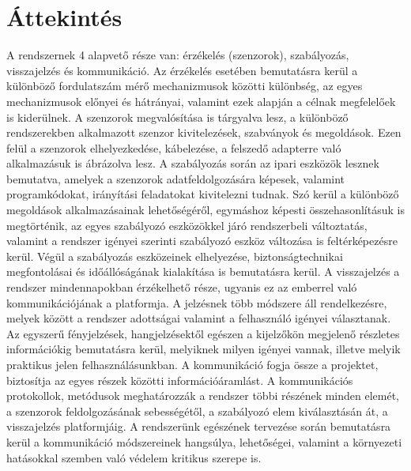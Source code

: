 \section{Áttekintés}

A rendszernek 4 alapvető része van: érzékelés (szenzorok), szabályozás, visszajelzés és kommunikáció.
Az érzékelés esetében bemutatásra kerül a különböző fordulatszám mérő mechanizmusok közötti különbség, az egyes mechanizmusok előnyei és hátrányai, valamint ezek alapján a célnak megfelelőek is kiderülnek. A szenzorok megvalósítása is tárgyalva lesz, a különböző rendszerekben alkalmazott szenzor kivitelezések, szabványok és megoldások. Ezen felül a szenzorok elhelyezkedése, kábelezése, a felszedő adapterre való alkalmazásuk is ábrázolva lesz.
A szabályozás során az ipari eszközök lesznek bemutatva, amelyek a szenzorok adatfeldolgozására képesek, valamint programkódokat, irányítási feladatokat kivitelezni tudnak. Szó kerül a különböző megoldások alkalmazásainak lehetőségéről, egymáshoz képesti összehasonlításuk is megtörténik, az egyes szabályozó eszközökkel járó rendszerbeli változtatás, valamint a rendszer igényei szerinti szabályozó eszköz változása is feltérképezésre kerül. Végül a szabályozás eszközeinek elhelyezése, biztonságtechnikai megfontolásai és időállóságának kialakítása is bemutatásra kerül.
A visszajelzés a rendszer mindennapokban érzékelhető része, ugyanis ez az emberrel való kommunikációjának a platformja. A jelzésnek több módszere áll rendelkezésre, melyek között a rendszer adottságai valamint a felhasználó igényei választanak. Az egyszerű fényjelzések, hangjelzésektől egészen a kijelzőkön megjelenő részletes információkig bemutatásra kerül, melyiknek milyen igényei vannak, illetve melyik praktikus jelen felhasználásunkban.
A kommunikáció fogja össze a projektet, biztosítja az egyes részek közötti információáramlást. A kommunikációs protokollok, metódusok meghatározzák a rendszer többi részének minden elemét, a szenzorok feldolgozásának sebességétől, a szabályozó elem kiválasztásán át, a visszajelzés platformjáig. A rendszerünk egészének tervezése során bemutatásra kerül a kommunikáció módszereinek hangsúlya, lehetőségei, valamint a környezeti hatásokkal szemben való védelem kritikus szerepe is.
